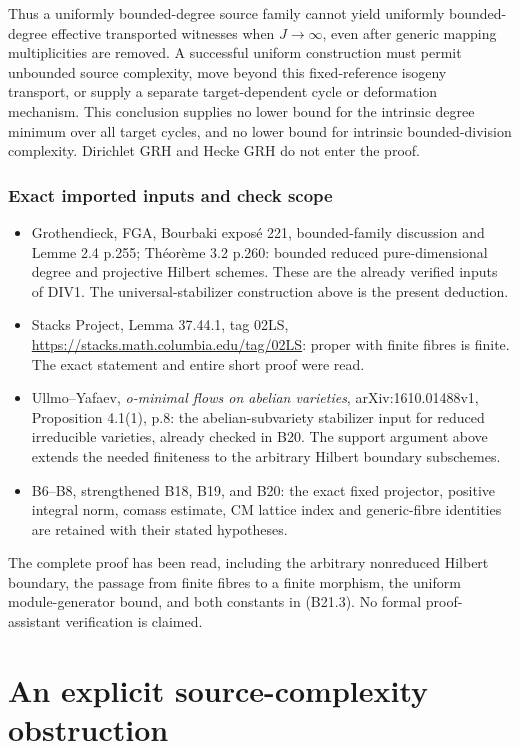 \documentclass[11pt,a4paper]{article}
\providecommand{\tightlist}{\setlength{\itemsep}{0pt}\setlength{\parskip}{0pt}}
\theoremstyle{definition}
\begin{document}
Thus a uniformly bounded-degree source family cannot yield uniformly bounded-degree effective transported witnesses when \(J\to\infty\), even after generic mapping multiplicities are removed. A successful uniform construction must permit unbounded source complexity, move beyond this fixed-reference isogeny transport, or supply a separate target-dependent cycle or deformation mechanism. This conclusion supplies no lower bound for the intrinsic degree minimum over all target cycles, and no lower bound for intrinsic bounded-division complexity. Dirichlet GRH and Hecke GRH do not enter the proof.

\subsubsection{Exact imported inputs and check scope}\label{exact-imported-inputs-and-check-scope}

\begin{itemize}
\tightlist
\item
  Grothendieck, FGA, Bourbaki exposé 221, bounded-family discussion and Lemme 2.4 p.255; Théorème 3.2 p.260: bounded reduced pure-dimensional degree and projective Hilbert schemes. These are the already verified inputs of DIV1. The universal-stabilizer construction above is the present deduction.
\item
  Stacks Project, Lemma 37.44.1, tag 02LS, \url{https://stacks.math.columbia.edu/tag/02LS}: proper with finite fibres is finite. The exact statement and entire short proof were read.
\item
  Ullmo--Yafaev, \emph{o-minimal flows on abelian varieties}, arXiv:1610.01488v1, Proposition 4.1(1), p.8: the abelian-subvariety stabilizer input for reduced irreducible varieties, already checked in B20. The support argument above extends the needed finiteness to the arbitrary Hilbert boundary subschemes.
\item
  B6--B8, strengthened B18, B19, and B20: the exact fixed projector, positive integral norm, comass estimate, CM lattice index and generic-fibre identities are retained with their stated hypotheses.
\end{itemize}

The complete proof has been read, including the arbitrary nonreduced Hilbert boundary, the passage from finite fibres to a finite morphism, the uniform module-generator bound, and both constants in (B21.3). No formal proof-assistant verification is claimed.

\section{An explicit source-complexity obstruction}
\end{document}
